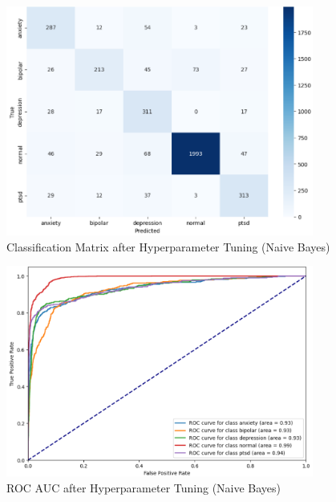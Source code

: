\begin{figure}[h!]  
    \centering
    \includegraphics[width=0.9\textwidth]{Images/HP NB CM.png}  
    \caption{Classification Matrix after Hyperparameter Tuning (Naive Bayes)}
    \label{LSTMROC7}  %
\end{figure}

\begin{figure}[h!]  
    \centering
    \includegraphics[width=0.9\textwidth]{Images/HP NB ROC.png}  
    \caption{ROC AUC after Hyperparameter Tuning (Naive Bayes)}
    \label{LSTMROC8}  %
\end{figure}

